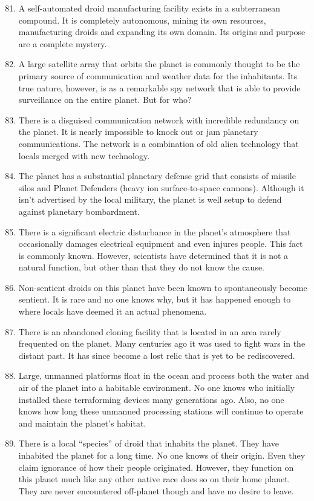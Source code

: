 \documentclass{article}
\begin{document}
\begin{enumerate}
	\setcounter{enumi}{80}
	\item A self-automated droid manufacturing facility exists in a subterranean compound. It is completely autonomous, mining its own resources, manufacturing droids and expanding its own domain. Its origins and purpose are a complete mystery.
	\item A large satellite array that orbits the planet is commonly thought to be the primary source of communication and weather data for the inhabitants. Its true nature, however, is as a remarkable spy network that is able to provide surveillance on the entire planet. But for who?
	\item There is a disguised communication network with incredible redundancy on the planet. It is nearly impossible to knock out or jam planetary communications. The network is a combination of old alien technology that locals merged with new technology.
	\item The planet has a substantial planetary defense grid that consists of missile silos and Planet Defenders (heavy ion surface-to-space cannons). Although it isn’t advertised by the local military, the planet is well setup to defend against planetary bombardment.
	\item There is a significant electric disturbance in the planet’s atmosphere that occasionally damages electrical equipment and even injures people. This fact is commonly known. However, scientists have determined that it is not a natural function, but other than that they do not know the cause.
	\item Non-sentient droids on this planet have been known to spontaneously become sentient. It is rare and no one knows why, but it has happened enough to where locals have deemed it an actual phenomena.
	\item There is an abandoned cloning facility that is located in an area rarely frequented on the planet. Many centuries ago it was used to fight wars in the distant past. It has since become a lost relic that is yet to be rediscovered.
	\item Large, unmanned platforms float in the ocean and process both the water and air of the planet into a habitable environment. No one knows who initially installed these terraforming devices many generations ago. Also, no one knows how long these unmanned processing stations will continue to operate and maintain the planet’s habitat.
	\item There is a local “species” of droid that inhabits the planet. They have inhabited the planet for a long time. No one knows of their origin. Even they claim ignorance of how their people originated. However, they function on this planet much like any other native race does so on their home planet. They are never encountered off-planet though and have no desire to leave.

\end{enumerate}
\end{document}
